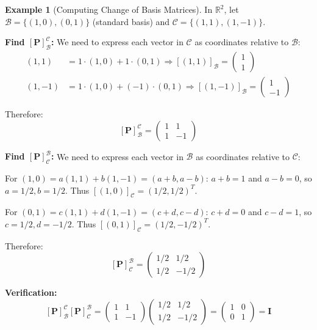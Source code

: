 \documentclass[12pt]{article}
\numberwithin{equation}{section}
\newcommand{\mat}[1]{\mathbf{#1}}        %
\theoremstyle{plain}
\theoremstyle{definition}
\newtheorem{example}[theorem]{Example}
\theoremstyle{remark}
\begin{document}
\begin{example}[Computing Change of Basis Matrices]
In $\mathbb{R}^2$, let $\mathcal{B} = \{(1,0), (0,1)\}$ (standard basis) and $\mathcal{C} = \{(1,1), (1,-1)\}$.

\textbf{Find $[\mat{P}]_{\mathcal{B}}^{\mathcal{C}}$:}
We need to express each vector in $\mathcal{C}$ as coordinates relative to $\mathcal{B}$:
\begin{align}
(1,1) &= 1 \cdot (1,0) + 1 \cdot (0,1) \Rightarrow [(1,1)]_{\mathcal{B}} = \begin{pmatrix} 1 \\ 1 \end{pmatrix} \\
(1,-1) &= 1 \cdot (1,0) + (-1) \cdot (0,1) \Rightarrow [(1,-1)]_{\mathcal{B}} = \begin{pmatrix} 1 \\ -1 \end{pmatrix}
\end{align}

Therefore:
$$[\mat{P}]_{\mathcal{B}}^{\mathcal{C}} = \begin{pmatrix} 1 & 1 \\ 1 & -1 \end{pmatrix}$$

\textbf{Find $[\mat{P}]_{\mathcal{C}}^{\mathcal{B}}$:}
We need to express each vector in $\mathcal{B}$ as coordinates relative to $\mathcal{C}$:

For $(1,0) = a(1,1) + b(1,-1) = (a+b, a-b)$:
$a + b = 1$ and $a - b = 0$, so $a = 1/2, b = 1/2$.
Thus $[(1,0)]_{\mathcal{C}} = (1/2, 1/2)^T$.

For $(0,1) = c(1,1) + d(1,-1) = (c+d, c-d)$:
$c + d = 0$ and $c - d = 1$, so $c = 1/2, d = -1/2$.
Thus $[(0,1)]_{\mathcal{C}} = (1/2, -1/2)^T$.

Therefore:
$$[\mat{P}]_{\mathcal{C}}^{\mathcal{B}} = \begin{pmatrix} 1/2 & 1/2 \\ 1/2 & -1/2 \end{pmatrix}$$

\textbf{Verification:}
$$[\mat{P}]_{\mathcal{B}}^{\mathcal{C}} [\mat{P}]_{\mathcal{C}}^{\mathcal{B}} = \begin{pmatrix} 1 & 1 \\ 1 & -1 \end{pmatrix}\begin{pmatrix} 1/2 & 1/2 \\ 1/2 & -1/2 \end{pmatrix} = \begin{pmatrix} 1 & 0 \\ 0 & 1 \end{pmatrix} = \mat{I}$$ \checkmark


\end{example}
\end{document}
